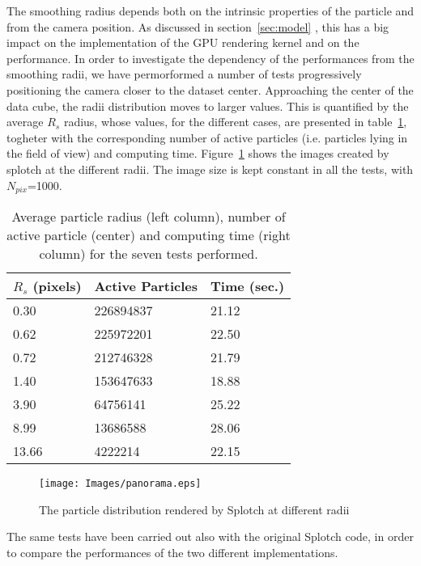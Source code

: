 \documentclass[11pt]{article}
\begin{document}
The smoothing radius depends both on the intrinsic properties of the particle
and from the camera position. 
As discussed in section~\ref{sec:model} , this has a big impact 
on the implementation of the GPU rendering kernel and
on the performance. In order to investigate the dependency of the performances from
the smoothing radii, we have permorformed a number of tests progressively 
positioning the camera closer to the dataset center. 
Approaching the center of the 
data cube, the radii distribution moves to larger values. This is quantified 
by the average $R_s$ radius, whose values, for the different cases, are presented in 
table~\ref{tab:radius}, togheter with the corresponding number of active particles 
(i.e. particles lying in the field of view) and computing time. 
Figure~\ref{fig:panorama} shows the images created by splotch at the different radii.
The image size is kept constant in all the tests, with $N_{pix}$=1000.

\begin{table}
\caption{Average particle radius (left column), number of active particle (center)
and computing time (right column) for the seven tests performed.}
\begin{center}
\begin{tabular}{|l|l|l|}
\hline
$R_s$ (pixels) & Active Particles & Time (sec.) \\
\hline
0.30   & 226894837  & 21.12 \\
\hline
0.62   & 225972201  & 22.50 \\
\hline
0.72   & 212746328  & 21.79 \\
\hline
1.40   & 153647633  & 18.88 \\
\hline
3.90   & 64756141   & 25.22 \\
\hline
8.99   & 13686588   & 28.06 \\
\hline
13.66  & 4222214    & 22.15 \\
\hline
\end{tabular}
\end{center}
\label{tab:radius}
\end{table}


\begin{figure}
\centering
\texttt{[image: Images/panorama.eps]}
\caption{The particle distribution rendered by Splotch at different radii}
\label{fig:panorama}
\end{figure}

The same tests have been carried out also with the original Splotch code, in order 
to compare the performances of the two different implementations. 
\end{document}
